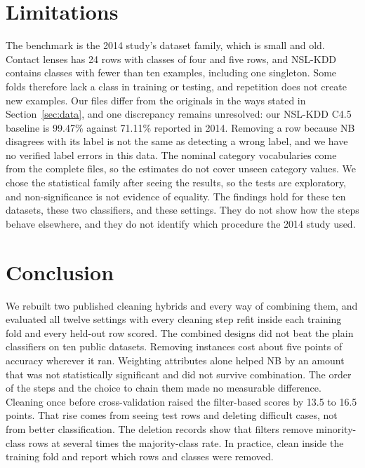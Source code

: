 \documentclass[conference]{IEEEtran}
\begin{document}
\section{Limitations}
The benchmark is the 2014 study's dataset family, which is small and old.
Contact lenses has 24 rows with classes of four and five rows, and NSL-KDD
contains classes with fewer than ten examples, including one singleton. Some
folds therefore lack a class in training or testing, and repetition does not
create new examples. Our files differ from the originals in the ways stated in
Section~\ref{sec:data}, and one discrepancy remains unresolved: our NSL-KDD
C4.5 baseline is 99.47\% against 71.11\% reported in 2014. Removing a row
because NB disagrees with its label is not the same as detecting a wrong
label, and we have no verified label errors in this data. The nominal category
vocabularies come from the complete files, so the estimates do not cover
unseen category values. We chose the statistical family after seeing the
results, so the tests are exploratory, and non-significance is not evidence of
equality. The findings hold for these ten datasets, these two classifiers, and
these settings. They do not show how the steps behave elsewhere, and they do
not identify which procedure the 2014 study used.

\section{Conclusion}
We rebuilt two published cleaning hybrids and every way of combining them, and
evaluated all twelve settings with every cleaning step refit inside each
training fold and every held-out row scored. The combined designs did not beat
the plain classifiers on ten public datasets. Removing instances cost about
five points of accuracy wherever it ran. Weighting attributes alone helped NB
by an amount that was not statistically significant and did not survive
combination. The order of the steps and the choice to chain them made no
measurable difference. Cleaning once before cross-validation raised the
filter-based scores by 13.5 to 16.5 points. That rise comes from seeing test
rows and deleting difficult cases, not from better classification. The
deletion records show that filters remove minority-class rows at several times
the majority-class rate. In practice, clean inside the training fold and
report which rows and classes were removed.



\end{document}
